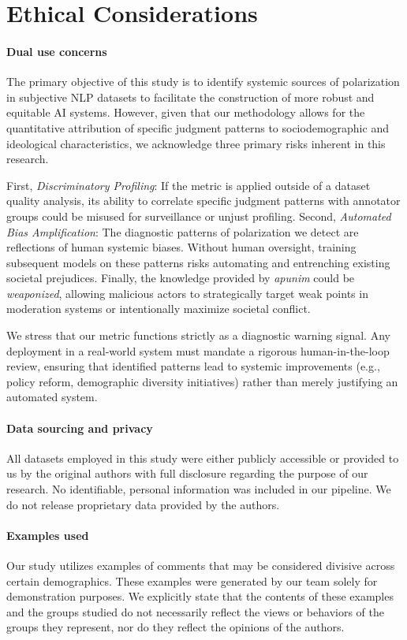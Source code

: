 \documentclass[11pt]{article}
\theoremstyle{definition}
\theoremstyle{plain}
\begin{document}
\section*{Ethical Considerations}

\paragraph{Dual use concerns}The primary objective of this study is to identify systemic sources of polarization in subjective NLP datasets to facilitate the construction of more robust and equitable AI systems. However, given that our methodology allows for the quantitative attribution of specific judgment patterns to sociodemographic and ideological characteristics, we acknowledge three primary risks inherent in this research.

First, \emph{Discriminatory Profiling}: If the metric is applied outside of a dataset quality analysis, its ability to correlate specific judgment patterns with annotator groups could be misused for surveillance or unjust profiling. Second, \emph{Automated Bias Amplification}: The diagnostic patterns of polarization we detect are reflections of human systemic biases. Without human oversight, training subsequent models on these patterns risks automating and entrenching existing societal prejudices. Finally, the knowledge provided by \emph{apunim} could be \emph{weaponized}, allowing malicious actors to strategically target weak points in moderation systems or intentionally maximize societal conflict.

We stress that our metric functions strictly as a diagnostic warning signal. Any deployment in a real-world system must mandate a rigorous human-in-the-loop review, ensuring that identified patterns lead to systemic improvements (e.g., policy reform, demographic diversity initiatives) rather than merely justifying an automated system.

\paragraph{Data sourcing and privacy} All datasets employed in this study were either publicly accessible or provided to us by the original authors with full disclosure regarding the purpose of our research. No identifiable, personal information was included in our pipeline. We do not release proprietary data provided by the authors.

\paragraph{Examples used} Our study utilizes examples of comments that may be considered divisive across certain demographics. These examples were generated by our team solely for demonstration purposes. We explicitly state that the contents of these examples and the groups studied do not necessarily reflect the views or behaviors of the groups they represent, nor do they reflect the opinions of the authors.
\end{document}
